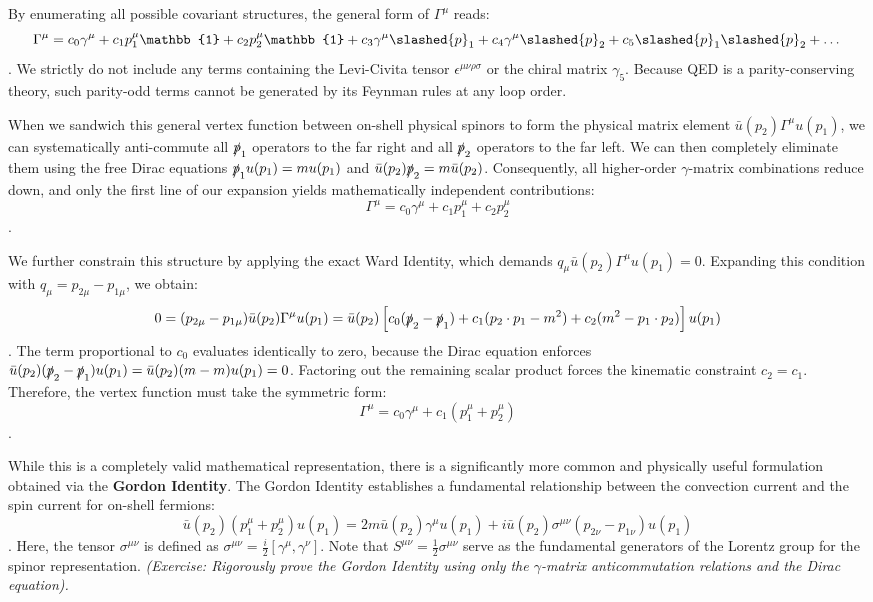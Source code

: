 By enumerating all possible covariant structures, the general form of $\Gamma^\mu$ reads:
\[ \Gamma^\mu = c_0 \gamma^\mu + c_1 p_1^\mu \mathbb{1} + c_2 p_2^\mu \mathbb{1} + c_3 \gamma^\mu \slashed{p}_1 + c_4 \gamma^\mu \slashed{p}_2 + c_5 \slashed{p}_1 \slashed{p}_2 + \dots \].
We strictly do not include any terms containing the Levi-Civita tensor $\epsilon^{\mu\nu\rho\sigma}$ or the chiral matrix $\gamma_5$. Because QED is a parity-conserving theory, such parity-odd terms cannot be generated by its Feynman rules at any loop order.

When we sandwich this general vertex function between on-shell physical spinors to form the physical matrix element $\bar{u}(p_2) \Gamma^\mu u(p_1)$, we can systematically anti-commute all $\slashed{p}_1$ operators to the far right and all $\slashed{p}_2$ operators to the far left. We can then completely eliminate them using the free Dirac equations $\slashed{p}_1 u(p_1) = m u(p_1)$ and $\bar{u}(p_2) \slashed{p}_2 = m \bar{u}(p_2)$. Consequently, all higher-order $\gamma$-matrix combinations reduce down, and only the first line of our expansion yields mathematically independent contributions:
\[ \Gamma^\mu = c_0 \gamma^\mu + c_1 p_1^\mu + c_2 p_2^\mu \].

We further constrain this structure by applying the exact Ward Identity, which demands $q_\mu \bar{u}(p_2) \Gamma^\mu u(p_1) = 0$. Expanding this condition with $q_\mu = p_{2\mu} - p_{1\mu}$, we obtain:
\[ 0 = (p_{2\mu} - p_{1\mu}) \bar{u}(p_2) \Gamma^\mu u(p_1) = \bar{u}(p_2) \left[ c_0 (\slashed{p}_2 - \slashed{p}_1) + c_1 (p_2 \cdot p_1 - m^2) + c_2 (m^2 - p_1 \cdot p_2) \right] u(p_1) \].
The term proportional to $c_0$ evaluates identically to zero, because the Dirac equation enforces $\bar{u}(p_2) (\slashed{p}_2 - \slashed{p}_1) u(p_1) = \bar{u}(p_2) (m - m) u(p_1) = 0$. Factoring out the remaining scalar product forces the kinematic constraint $c_2 = c_1$.
Therefore, the vertex function must take the symmetric form:
\[ \Gamma^\mu = c_0 \gamma^\mu + c_1 (p_1^\mu + p_2^\mu) \].

While this is a completely valid mathematical representation, there is a significantly more common and physically useful formulation obtained via the \textbf{Gordon Identity}. The Gordon Identity establishes a fundamental relationship between the convection current and the spin current for on-shell fermions:
\[ \bar{u}(p_2) (p_1^\mu + p_2^\mu) u(p_1) = 2m \bar{u}(p_2) \gamma^\mu u(p_1) + i \bar{u}(p_2) \sigma^{\mu\nu} (p_{2\nu} - p_{1\nu}) u(p_1) \].
Here, the tensor $\sigma^{\mu\nu}$ is defined as $\sigma^{\mu\nu} = \frac{i}{2}[\gamma^\mu, \gamma^\nu]$. Note that $S^{\mu\nu} = \frac{1}{2}\sigma^{\mu\nu}$ serve as the fundamental generators of the Lorentz group for the spinor representation. \textit{(Exercise: Rigorously prove the Gordon Identity using only the $\gamma$-matrix anticommutation relations and the Dirac equation).}

